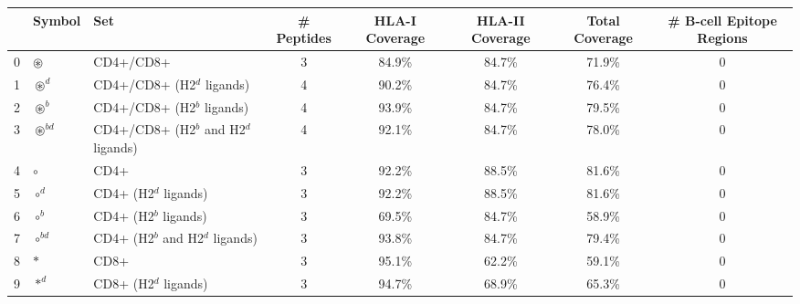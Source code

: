 \begin{tabular}{rllccccc}
\toprule
{} &                                               Symbol &                                      Set &  \# Peptides & HLA-I Coverage & HLA-II Coverage & Total Coverage &  \# B-cell Epitope Regions \\
\midrule
0  &                                      $ \circledast $ &                                CD4+/CD8+ &            3 &         84.9\% &          84.7\% &         71.9\% &                          0 \\
1  &                                    $ \circledast^d $ &               CD4+/CD8+ (H2$^d$ ligands) &            4 &         90.2\% &          84.7\% &         76.4\% &                          0 \\
2  &                                    $ \circledast^b $ &               CD4+/CD8+ (H2$^b$ ligands) &            4 &         93.9\% &          84.7\% &         79.5\% &                          0 \\
3  &                                 $ \circledast^{bd} $ &    CD4+/CD8+ (H2$^b$ and H2$^d$ ligands) &            4 &         92.1\% &          84.7\% &         78.0\% &                          0 \\
4  &                                            $ \circ $ &                                     CD4+ &            3 &         92.2\% &          88.5\% &         81.6\% &                          0 \\
5  &                                          $ \circ^d $ &                    CD4+ (H2$^d$ ligands) &            3 &         92.2\% &          88.5\% &         81.6\% &                          0 \\
6  &                                          $ \circ^b $ &                    CD4+ (H2$^b$ ligands) &            3 &         69.5\% &          84.7\% &         58.9\% &                          0 \\
7  &                                       $ \circ^{bd} $ &         CD4+ (H2$^b$ and H2$^d$ ligands) &            3 &         93.8\% &          84.7\% &         79.4\% &                          0 \\
8  &                                             $ \ast $ &                                     CD8+ &            3 &         95.1\% &          62.2\% &         59.1\% &                          0 \\
9  &                                           $ \ast^d $ &                    CD8+ (H2$^d$ ligands) &            3 &         94.7\% &          68.9\% &         65.3\% &                          0 \\

\end{tabular}
